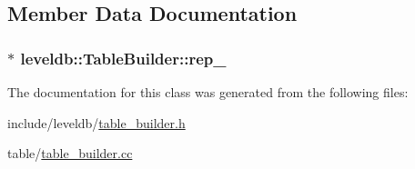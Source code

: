 \subsection{Member Data Documentation}
\hypertarget{classleveldb_1_1_table_builder_ab68d537c17c94be9ba6650b1db9bff74}{
\subsubsection[{rep\-\_\-}]{$\ast$ leveldb\-::\-Table\-Builder\-::rep\-\_\-\hspace{0.3cm}{\ttfamily [private]}}}\label{classleveldb_1_1_table_builder_ab68d537c17c94be9ba6650b1db9bff74}


The documentation for this class was generated from the following files\-:\begin{DoxyCompactItemize}
\item 
include/leveldb/\hyperlink{table__builder_8h}{table\-\_\-builder.\-h}\item 
table/\hyperlink{table__builder_8cc}{table\-\_\-builder.\-cc}\end{DoxyCompactItemize}
